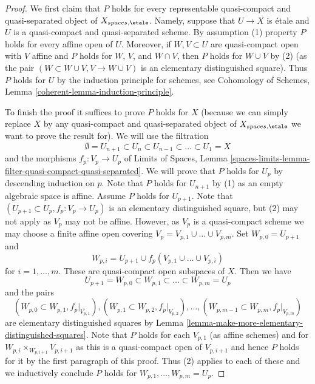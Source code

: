 \begin{proof}
We first claim that $P$ holds for every representable
quasi-compact and quasi-separated object of $X_{spaces, \etale}$.
Namely, suppose that $U \to X$ is \'etale and $U$ is a
quasi-compact and quasi-separated scheme. By assumption (1)
property $P$ holds for every affine open of $U$. Moreover, if
$W, V \subset U$ are quasi-compact open with $V$ affine and $P$ holds for 
$W$, $V$, and $W \cap V$, then $P$ holds for $W \cup V$ by (2)
(as the pair $(W \subset W \cup V, V \to W \cup V)$ is an elementary
distinguished square). Thus $P$ holds for $U$ by the induction
principle for schemes, see
Cohomology of Schemes, Lemma \ref{coherent-lemma-induction-principle}.

\medskip\noindent
To finish the proof it suffices to prove $P$ holds for $X$
(because we can simply replace $X$ by any quasi-compact and quasi-separated
object of $X_{spaces, \etale}$ we want to prove the result for).
We will use the filtration
$$
\emptyset = U_{n + 1} \subset
U_n \subset U_{n - 1} \subset \ldots \subset U_1 = X
$$
and the morphisms $f_p : V_p \to U_p$ of
Limits of Spaces, Lemma
\ref{spaces-limits-lemma-filter-quasi-compact-quasi-separated}.
We will prove that $P$ holds for $U_p$ by descending induction on $p$.
Note that $P$ holds for $U_{n + 1}$ by (1)
as an empty algebraic space is affine. Assume $P$ holds for $U_{p + 1}$.
Note that $(U_{p + 1} \subset U_p, f_p : V_p \to U_p)$ is an elementary
distinguished square, but (2) may not apply as $V_p$ may not be affine.
However, as $V_p$ is a quasi-compact scheme we may choose a finite affine open
covering $V_p = V_{p, 1} \cup \ldots \cup V_{p, m}$.
Set $W_{p, 0} = U_{p + 1}$ and
$$
W_{p, i} = U_{p + 1} \cup f_p(V_{p, 1} \cup \ldots \cup V_{p, i})
$$
for $i = 1, \ldots, m$. These are quasi-compact open subspaces of $X$.
Then we have
$$
U_{p + 1} = W_{p, 0} \subset
W_{p, 1} \subset \ldots \subset
W_{p, m} = U_p
$$
and the pairs
$$
(W_{p, 0} \subset W_{p, 1}, f_p|_{V_{p, 1}}),
(W_{p, 1} \subset W_{p, 2}, f_p|_{V_{p, 2}}),\ldots,
(W_{p, m - 1} \subset W_{p, m}, f_p|_{V_{p, m}})
$$
are elementary distinguished squares by
Lemma \ref{lemma-make-more-elementary-distinguished-squares}.
Note that $P$ holds for each $V_{p, 1}$ (as affine schemes) and for
$W_{p, i} \times_{W_{p, i + 1}} V_{p, i + 1}$ as this is a quasi-compact
open of $V_{p, i + 1}$ and hence $P$ holds for it by the first paragraph
of this proof. Thus (2) applies to each of these and we inductively
conclude $P$ holds for $W_{p, 1}, \ldots, W_{p, m} = U_p$.
\end{proof}

